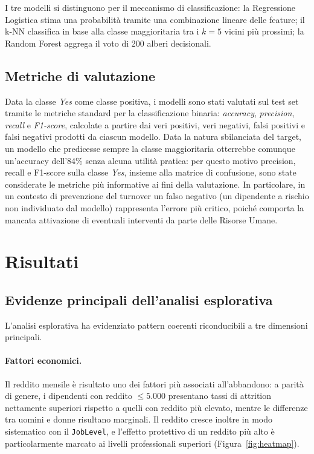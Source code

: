 \documentclass{article}
\begin{document}
\noindent I tre modelli si distinguono per il meccanismo di classificazione: la Regressione Logistica stima una probabilità tramite una combinazione lineare delle feature; il k-NN classifica in base alla classe maggioritaria tra i $k=5$ vicini più prossimi; la Random Forest aggrega il voto di 200 alberi decisionali.


\subsection{Metriche di valutazione}
\label{sec:metodologia-metriche}

Data la classe \emph{Yes} come classe positiva, i modelli sono stati valutati sul test set tramite le metriche standard per la classificazione binaria: \emph{accuracy}, \emph{precision}, \emph{recall} e \emph{F1-score}, calcolate a partire dai veri positivi, veri negativi, falsi positivi e falsi negativi prodotti da ciascun modello. Data la natura sbilanciata del target, un modello che predicesse sempre la classe maggioritaria otterrebbe comunque un'accuracy dell'84\% senza alcuna utilità pratica: per questo motivo precision, recall e F1-score sulla classe \emph{Yes}, insieme alla matrice di confusione, sono state considerate le metriche più informative ai fini della valutazione. In particolare, in un contesto di prevenzione del turnover un falso negativo (un dipendente a rischio non individuato dal modello) rappresenta l'errore più critico, poiché comporta la mancata attivazione di eventuali interventi da parte delle Risorse Umane.

\newpage

\section{Risultati}
\label{sec:risultati}

\subsection{Evidenze principali dell'analisi esplorativa}
\label{sec:risultati-eda}

L'analisi esplorativa ha evidenziato pattern coerenti riconducibili a tre dimensioni principali.

\paragraph{Fattori economici.} Il reddito mensile è risultato uno dei fattori più associati all'abbandono: a parità di genere, i dipendenti con reddito $\leq 5.000$ presentano tassi di attrition nettamente superiori rispetto a quelli con reddito più elevato, mentre le differenze tra uomini e donne risultano marginali. Il reddito cresce inoltre in modo sistematico con il \texttt{JobLevel}, e l'effetto protettivo di un reddito più alto è particolarmente marcato ai livelli professionali superiori (Figura~\ref{fig:heatmap}).
\end{document}

